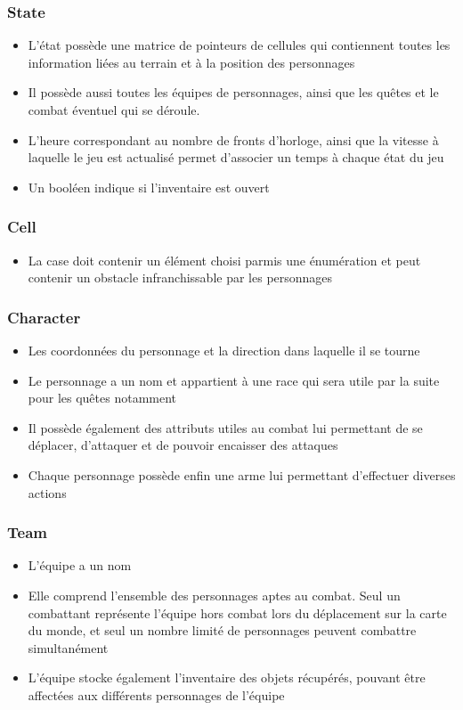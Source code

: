 \documentclass[a4paper,12pt]{article}
\begin{document}
\subsubsection{State}
\begin{itemize}
\item L'état possède une matrice de pointeurs de cellules qui contiennent toutes les information liées au terrain et à la position des personnages
\item Il possède aussi toutes les équipes de personnages, ainsi que les quêtes et le combat éventuel qui se déroule.
\item L'heure correspondant au nombre de fronts d'horloge, ainsi que la vitesse à laquelle le jeu est actualisé permet d'associer un temps à chaque état du jeu
\item Un booléen indique si l'inventaire est ouvert
\end{itemize}

\subsubsection{Cell}
\begin{itemize}
\item La case doit contenir un élément choisi parmis une énumération et peut contenir un obstacle infranchissable par les personnages
\end{itemize}

\subsubsection{Character}
\begin{itemize}
\item Les coordonnées du personnage et la direction dans laquelle il se tourne
\item Le personnage a un nom et appartient à une race qui sera utile par la suite pour les quêtes notamment
\item Il possède également des attributs utiles au combat lui permettant de se déplacer, d'attaquer et de pouvoir encaisser des attaques
\item Chaque personnage possède enfin une arme lui permettant d'effectuer diverses actions
\end{itemize}

\subsubsection{Team}
\begin{itemize}
\item L'équipe a un nom
\item Elle comprend l'ensemble des personnages aptes au combat. Seul un combattant représente l'équipe hors combat lors du déplacement sur la carte du monde, et seul un nombre limité de personnages peuvent combattre simultanément
\item L'équipe stocke également l'inventaire des objets récupérés, pouvant être affectées aux différents personnages de l'équipe
\end{itemize}
\end{document}
